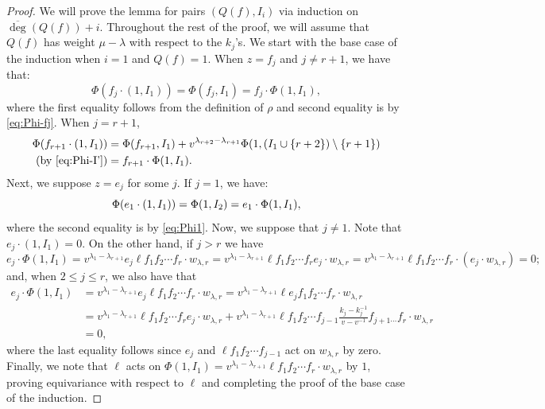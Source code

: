\documentclass{amsart}
\numberwithin{equation}{section}
\theoremstyle{theorem}
\theoremstyle{definition}
\newcommand{\sm}{\setminus}
\newcommand{\ol}{\overline}
\begin{document}
\begin{proof}
We will prove the lemma for pairs $(Q(f), I_i)$ via induction on $\ol\deg(Q(f))+i$. Throughout the rest of the proof, we will assume that $Q(f)$ has weight $\mu-\lambda$ with respect to the $k_j$'s. We start with the base case of the induction when $i=1$ and $Q(f)=1$. When $z=f_j$ and $j\neq r+1$, we have that:
\begin{equation}\label{eq:fj-11}\Phi(f_j\cdot (1, I_1)) = \Phi(f_j, I_1) = f_j\cdot \Phi(1,I_{1}),\end{equation}
where the first equality follows from the definition of $\rho$ and second equality is by \eqref{eq:Phi-fj}. %
When $j=r+1$, 
\begin{align}
\notag\Phi(f_{r+1}\cdot (1, I_1)) &= \Phi(f_{r+1}, I_1) + v^{\lambda_{r+2}-\lambda_{r+1}}\Phi(1,(I_1\cup\{r+2\})\sm\{r+1\})\\
\label{eq:fr-11}\text{(by \eqref{eq:Phi-I'})}&= f_{r+1}\cdot \Phi(1,I_{1}).
\end{align}
Next, we suppose $z=e_j$ for some $j$. If $j=1$, we have:
\[\Phi(e_1\cdot (1,I_1))  = \Phi(1,I_2)\\
 = e_1\cdot \Phi(1,I_1),\]
where the second equality is by \eqref{eq:Phi1}. Now, we suppose that $j\neq 1$. Note that $e_j\cdot (1,I_1)=0$. On the other hand, if $j>r$ we have
\[e_j\cdot\Phi(1,I_1)= v^{\lambda_1-\lambda_{r+1}}e_j\ell f_1f_2\cdots f_r\cdot w_{\lambda,r}=v^{\lambda_1-\lambda_{r+1}}\ell f_1f_2\cdots f_re_j\cdot w_{\lambda,r}=v^{\lambda_1-\lambda_{r+1}}\ell f_1f_2\cdots f_r\cdot( e_j\cdot w_{\lambda,r})=0;\]
and, when $2\leq j\leq r$, we also have that
\begin{align*}
e_j\cdot\Phi(1,I_1)&= v^{\lambda_1-\lambda_{r+1}}e_j\ell f_1f_2\cdots f_r\cdot w_{\lambda,r}=v^{\lambda_1-\lambda_{r+1}}\ell e_j f_1f_2\cdots f_r\cdot w_{\lambda,r}\\
&=v^{\lambda_1-\lambda_{r+1}}\ell f_1f_2\cdots f_re_j\cdot w_{\lambda,r} + v^{\lambda_1-\lambda_{r+1}}\ell f_1f_2\cdots f_{j-1}\frac{k_j-k_j^{-1}}{v-v^{-1}}f_{j+1\cdots}f_r\cdot w_{\lambda,r}\\
&=0,
\end{align*}
where the last equality follows since $e_j$ and $\ell f_1f_2\cdots f_{j-1}$ act on $w_{\lambda, r}$ by zero. Finally, we note that $\ell$ acts on $\Phi(1,I_1) = v^{\lambda_1-\lambda_{r+1}}\ell f_1f_2\cdots f_r \cdot w_{\lambda, r}$ by $1$, proving equivariance with respect to $\ell$ and completing the proof of the base case of the induction.


\end{proof}
\end{document}
